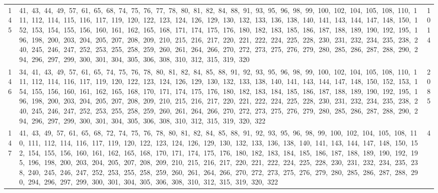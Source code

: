 \begin{longtable}{c|p{}|r}
145 & 41,\ 43,\ 44,\ 49,\ 57,\ 61,\ 65,\ 68,\ 74,\ 75,\ 76,\ 77,\ 78,\ 80,\ 81,\ 82,\ 84,\ 88,\ 91,\ 93,\ 95,\ 96,\ 98,\ 99,\ 100,\ 102,\ 104,\ 105,\ 108,\ 110,\ 111,\ 112,\ 114,\ 115,\ 116,\ 117,\ 119,\ 120,\ 122,\ 123,\ 124,\ 126,\ 129,\ 130,\ 132,\ 133,\ 136,\ 138,\ 140,\ 141,\ 143,\ 144,\ 147,\ 148,\ 150,\ 152,\ 153,\ 154,\ 155,\ 156,\ 160,\ 161,\ 162,\ 165,\ 168,\ 171,\ 174,\ 175,\ 176,\ 180,\ 182,\ 183,\ 185,\ 186,\ 187,\ 188,\ 189,\ 190,\ 192,\ 195,\ 196,\ 198,\ 200,\ 203,\ 204,\ 205,\ 207,\ 208,\ 209,\ 210,\ 215,\ 216,\ 217,\ 220,\ 221,\ 222,\ 224,\ 225,\ 228,\ 230,\ 231,\ 232,\ 234,\ 235,\ 238,\ 240,\ 245,\ 246,\ 247,\ 252,\ 253,\ 255,\ 258,\ 259,\ 260,\ 261,\ 264,\ 266,\ 270,\ 272,\ 273,\ 275,\ 276,\ 279,\ 280,\ 285,\ 286,\ 287,\ 288,\ 290,\ 294,\ 296,\ 297,\ 299,\ 300,\ 301,\ 304,\ 305,\ 306,\ 308,\ 310,\ 312,\ 315,\ 319,\ 320 & 1014 \\
146 & 34,\ 41,\ 43,\ 49,\ 57,\ 61,\ 65,\ 74,\ 75,\ 76,\ 78,\ 80,\ 81,\ 82,\ 84,\ 85,\ 88,\ 91,\ 92,\ 93,\ 95,\ 96,\ 98,\ 99,\ 100,\ 102,\ 104,\ 105,\ 108,\ 110,\ 111,\ 112,\ 114,\ 116,\ 117,\ 119,\ 120,\ 122,\ 123,\ 124,\ 126,\ 129,\ 130,\ 132,\ 133,\ 138,\ 140,\ 141,\ 143,\ 144,\ 147,\ 148,\ 150,\ 152,\ 153,\ 154,\ 155,\ 156,\ 160,\ 161,\ 162,\ 165,\ 168,\ 170,\ 171,\ 174,\ 175,\ 176,\ 180,\ 182,\ 183,\ 184,\ 185,\ 186,\ 187,\ 188,\ 189,\ 190,\ 192,\ 195,\ 196,\ 198,\ 200,\ 203,\ 204,\ 205,\ 207,\ 208,\ 209,\ 210,\ 215,\ 216,\ 217,\ 220,\ 221,\ 222,\ 224,\ 225,\ 228,\ 230,\ 231,\ 232,\ 234,\ 235,\ 238,\ 240,\ 245,\ 246,\ 247,\ 252,\ 253,\ 255,\ 258,\ 259,\ 260,\ 261,\ 264,\ 266,\ 270,\ 272,\ 273,\ 275,\ 276,\ 279,\ 280,\ 285,\ 286,\ 287,\ 288,\ 290,\ 294,\ 296,\ 297,\ 299,\ 300,\ 301,\ 304,\ 305,\ 306,\ 308,\ 310,\ 312,\ 315,\ 319,\ 320,\ 322 & 2085 \\
147 & 41,\ 43,\ 49,\ 57,\ 61,\ 65,\ 68,\ 72,\ 74,\ 75,\ 76,\ 78,\ 80,\ 81,\ 82,\ 84,\ 85,\ 88,\ 91,\ 92,\ 93,\ 95,\ 96,\ 98,\ 99,\ 100,\ 102,\ 104,\ 105,\ 108,\ 110,\ 111,\ 112,\ 114,\ 116,\ 117,\ 119,\ 120,\ 122,\ 123,\ 124,\ 126,\ 129,\ 130,\ 132,\ 133,\ 136,\ 138,\ 140,\ 141,\ 143,\ 144,\ 147,\ 148,\ 150,\ 152,\ 154,\ 155,\ 156,\ 160,\ 161,\ 162,\ 165,\ 168,\ 170,\ 171,\ 174,\ 175,\ 176,\ 180,\ 182,\ 183,\ 184,\ 185,\ 186,\ 187,\ 188,\ 189,\ 190,\ 192,\ 195,\ 196,\ 198,\ 200,\ 203,\ 204,\ 205,\ 207,\ 208,\ 209,\ 210,\ 215,\ 216,\ 217,\ 220,\ 221,\ 222,\ 224,\ 225,\ 228,\ 230,\ 231,\ 232,\ 234,\ 235,\ 238,\ 240,\ 245,\ 246,\ 247,\ 252,\ 253,\ 255,\ 258,\ 259,\ 260,\ 261,\ 264,\ 266,\ 270,\ 272,\ 273,\ 275,\ 276,\ 279,\ 280,\ 285,\ 286,\ 287,\ 288,\ 290,\ 294,\ 296,\ 297,\ 299,\ 300,\ 301,\ 304,\ 305,\ 306,\ 308,\ 310,\ 312,\ 315,\ 319,\ 320,\ 322 & 4 \\

\end{longtable}
